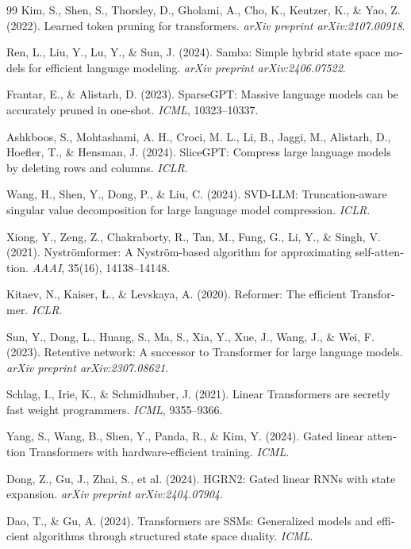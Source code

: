 \documentclass[12pt,a4paper]{report}
\theoremstyle{definition}
\begin{document}
\begin{latin}
\begin{thebibliography}{99}
Kim, S., Shen, S., Thorsley, D., Gholami, A., Cho, K., Keutzer, K., \& Yao, Z. (2022).
Learned token pruning for transformers.
\textit{arXiv preprint arXiv:2107.00918}.

Ren, L., Liu, Y., Lu, Y., \& Sun, J. (2024).
Samba: Simple hybrid state space models for efficient language modeling.
\textit{arXiv preprint arXiv:2406.07522}.

Frantar, E., \& Alistarh, D. (2023).
SparseGPT: Massive language models can be accurately pruned in one-shot.
\textit{ICML}, 10323--10337.

Ashkboos, S., Mohtashami, A. H., Croci, M. L., Li, B., Jaggi, M., Alistarh, D., Hoefler, T., \& Hensman, J. (2024).
SliceGPT: Compress large language models by deleting rows and columns.
\textit{ICLR}.

Wang, H., Shen, Y., Dong, P., \& Liu, C. (2024).
SVD-LLM: Truncation-aware singular value decomposition for large language model compression.
\textit{ICLR}.

Xiong, Y., Zeng, Z., Chakraborty, R., Tan, M., Fung, G., Li, Y., \& Singh, V. (2021).
Nystr{\"o}mformer: A Nystr{\"o}m-based algorithm for approximating self-attention.
\textit{AAAI}, 35(16), 14138--14148.

Kitaev, N., Kaiser, {\L}., \& Levskaya, A. (2020).
Reformer: The efficient Transformer.
\textit{ICLR}.

Sun, Y., Dong, L., Huang, S., Ma, S., Xia, Y., Xue, J., Wang, J., \& Wei, F. (2023).
Retentive network: A successor to Transformer for large language models.
\textit{arXiv preprint arXiv:2307.08621}.

Schlag, I., Irie, K., \& Schmidhuber, J. (2021).
Linear Transformers are secretly fast weight programmers.
\textit{ICML}, 9355--9366.

Yang, S., Wang, B., Shen, Y., Panda, R., \& Kim, Y. (2024).
Gated linear attention Transformers with hardware-efficient training.
\textit{ICML}.

Dong, Z., Gu, J., Zhai, S., et al. (2024).
HGRN2: Gated linear RNNs with state expansion.
\textit{arXiv preprint arXiv:2404.07904}.

Dao, T., \& Gu, A. (2024).
Transformers are SSMs: Generalized models and efficient algorithms through structured state space duality.
\textit{ICML}.


\end{thebibliography}
\end{latin}
\end{document}
